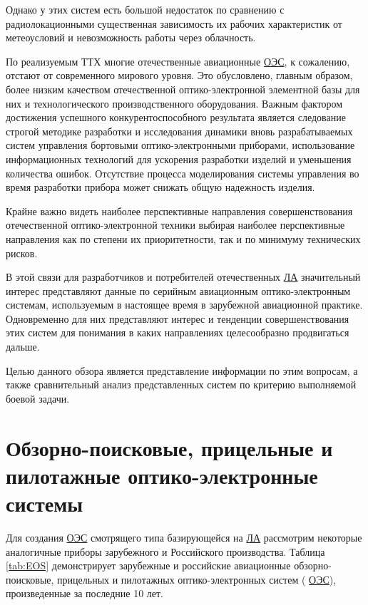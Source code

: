 Однако у этих систем есть большой недостаток по сравнению с радиолокационными существенная зависимость их рабочих характеристик от метеоусловий и невозможность работы через облачность. 

По реализуемым ТТХ многие отечественные авиационные  \hyperref[acroEOS]{ОЭС}, к сожалению, отстают от современного мирового уровня. Это обусловлено, главным образом, более низким качеством отечественной оптико-электронной элементной базы для них и технологического производственного оборудования. Важным фактором достижения успешного конкурентоспособного результата является следование строгой методике разработки и исследования динамики вновь разрабатываемых систем управления бортовыми оптико-электронными приборами, использование информационных технологий для ускорения разработки изделий и уменьшения количества ошибок. Отсутствие процесса моделирования системы управления во время разработки прибора может снижать общую надежность изделия.

Крайне важно видеть наиболее перспективные направления совершенствования отечественной оптико-электронной техники выбирая наиболее перспективные направления как по степени их приоритетности, так и по минимуму технических рисков. 

В этой связи для разработчиков и потребителей отечественных  \hyperref[acroLA]{ЛА} значительный интерес представляют данные по серийным авиационным оптико-электронным системам, используемым в настоящее время в зарубежной авиационной практике. Одновременно для них представляют интерес и тенденции совершенствования этих систем для понимания в каких направлениях целесообразно продвигаться дальше. 

Целью данного обзора является представление информации по этим вопросам, а также сравнительный анализ представленных систем по критерию выполняемой боевой задачи. 

\section{Обзорно-поисковые, прицельные и пилотажные оптико-электронные системы} \label{sec:ch1/sec1-}

Для создания  \hyperref[acroEOS]{ОЭС} смотрящего типа базирующейся на  \hyperref[acroLA]{ЛА} рассмотрим некоторые аналогичные приборы зарубежного и Российского производства. Таблица \ref{tab:EOS} демонстрирует зарубежные и российские авиационные обзорно-поисковые, прицельных и пилотажных оптико-электронных систем ( \hyperref[acroEOS]{ОЭС}), произведенные за последние 10 лет. 

